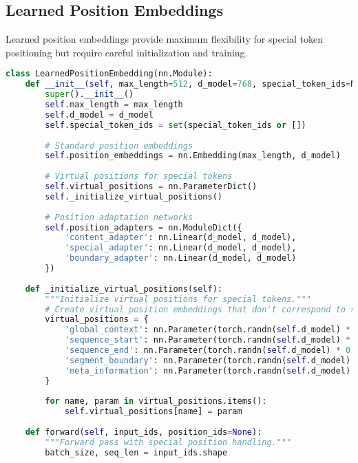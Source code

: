 \subsection{Learned Position Embeddings}

Learned position embeddings provide maximum flexibility for special token positioning but require careful initialization and training.

\begin{lstlisting}[language=Python, caption=Learned position embeddings with special token support]
class LearnedPositionEmbedding(nn.Module):
    def __init__(self, max_length=512, d_model=768, special_token_ids=None):
        super().__init__()
        self.max_length = max_length
        self.d_model = d_model
        self.special_token_ids = set(special_token_ids or [])
        
        # Standard position embeddings
        self.position_embeddings = nn.Embedding(max_length, d_model)
        
        # Virtual positions for special tokens
        self.virtual_positions = nn.ParameterDict()
        self._initialize_virtual_positions()
        
        # Position adaptation networks
        self.position_adapters = nn.ModuleDict({
            'content_adapter': nn.Linear(d_model, d_model),
            'special_adapter': nn.Linear(d_model, d_model),
            'boundary_adapter': nn.Linear(d_model, d_model)
        })
        
    def _initialize_virtual_positions(self):
        """Initialize virtual positions for special tokens."""
        # Create virtual position embeddings that don't correspond to sequence positions
        virtual_positions = {
            'global_context': nn.Parameter(torch.randn(self.d_model) * 0.02),
            'sequence_start': nn.Parameter(torch.randn(self.d_model) * 0.02),
            'sequence_end': nn.Parameter(torch.randn(self.d_model) * 0.02),
            'segment_boundary': nn.Parameter(torch.randn(self.d_model) * 0.02),
            'meta_information': nn.Parameter(torch.randn(self.d_model) * 0.02)
        }
        
        for name, param in virtual_positions.items():
            self.virtual_positions[name] = param
            
    def forward(self, input_ids, position_ids=None):
        """Forward pass with special position handling."""
        batch_size, seq_len = input_ids.shape
        

\end{lstlisting}
